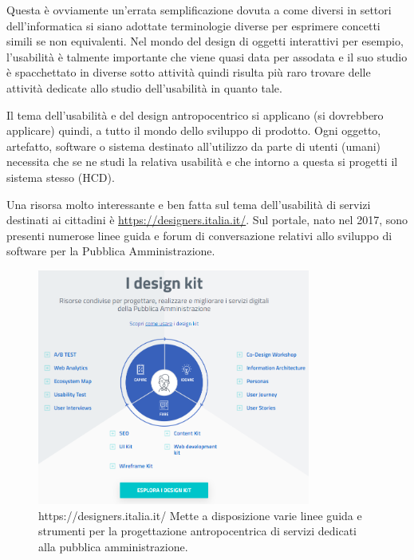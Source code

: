 Questa è ovviamente un'errata semplificazione dovuta a come diversi in settori dell'informatica si siano adottate terminologie diverse per esprimere concetti simili se non equivalenti. Nel mondo del design di oggetti interattivi per esempio, l'usabilità è talmente importante che viene quasi data per assodata e il suo studio è spacchettato in diverse sotto attività quindi risulta più raro trovare delle attività dedicate allo studio dell'usabilità in quanto tale.

Il tema dell'usabilità e del design antropocentrico si applicano (si dovrebbero applicare) quindi, a tutto il mondo dello sviluppo di prodotto. Ogni oggetto, artefatto, software o sistema destinato all'utilizzo da parte di utenti (umani) necessita che se ne studi la relativa usabilità e che intorno a questa si progetti il sistema stesso (HCD).

Una risorsa molto interessante e ben fatta sul tema dell'usabilità di servizi destinati ai cittadini è \url{https://designers.italia.it/}. Sul portale, nato nel 2017, sono presenti numerose linee guida e forum di conversazione relativi allo sviluppo di software per la Pubblica Amministrazione. 

\begin{figure}[!h]
	\centering
	\includegraphics[width=0.8\textwidth]{immagini/designeritalia}
	\caption{https://designers.italia.it/ Mette a disposizione varie linee guida e strumenti per la progettazione antropocentrica di servizi dedicati alla pubblica amministrazione.}
	\label{designersitalia}
\end{figure}

